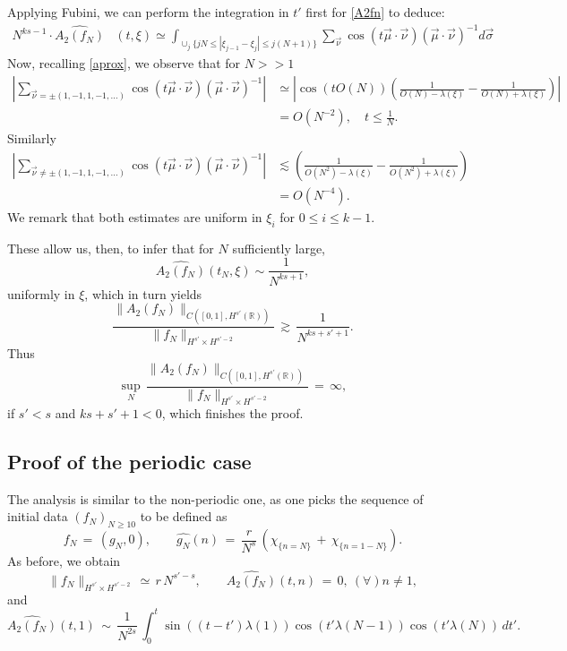 \documentclass{amsart}
\begin{document}
Applying Fubini, we can perform the integration in $t'$ first for \eqref{A2fn} to deduce:
\begin{equation}
  \begin{split}
    N^{ks -1}\cdot \widehat{A_2(f_N)}&(t,\xi)
    \simeq
    \int_{\cup_{j}\{jN \leq |\xi_{j-1}-\xi_{j}|\leq j(N+1)\}}
    \sum_{\vec{\nu}}  \cos(t \vec{\mu} \cdot \vec{\nu}) (\vec{\mu} \cdot \vec{\nu})^{-1}
    d \vec{\sigma} 
  \end{split}
\end{equation}
Now, recalling \eqref{aprox}, we observe that for $N >>1$
\begin{equation*}
\begin{split}
| \sum_{\vec{\nu} = \pm (1, -1, 1, -1, \dots)}  \cos(t \vec{\mu} \cdot \vec{\nu}) (\vec{\mu} \cdot \vec{\nu})^{-1} |
& \simeq 
\left | \cos(t O(N)) 
\left ( \frac{1}{O(N) - \lambda(\xi)} - \frac{1}{O(N)+ \lambda(\xi)} \right ) \right |
\\
& = O(N^{-2}), \quad  t \le \frac{1}{N}.
\end{split}
\end{equation*}
Similarly
\begin{equation*}
\begin{split}
| \sum_{\vec{\nu} \neq \pm (1, -1, 1, -1, \dots)}  \cos(t \vec{\mu} \cdot \vec{\nu}) (\vec{\mu} \cdot \vec{\nu})^{-1} |
& \lesssim
\left ( \frac{1}{O(N^{2}) - \lambda(\xi)} - \frac{1}{O(N^{2})+ \lambda(\xi)} \right )
\\
& = O(N^{-4}).
\end{split}
\end{equation*}
%
%
We remark that both estimates are uniform in $\xi_{i}$ for $0 \le i \le k-1$.

These allow us, then, to infer that for $N$ sufficiently large,
\[
\widehat{A_2(f_N)}(t_N,\xi) \sim \frac{1}{N^{ks+1}},
\]
uniformly in $\xi$, which in turn yields
\[
\frac{\|A_2(f_N)\|_{C([0,1], H^{s'}(\mathbb{R}))}}{\|f_N\|_{H^{s'}\times H^{s'-2}}}\,\gtrsim\, \frac{1}{N^{ks+s'+1}}.\]
Thus
\[
\sup_N\,\frac{\|A_2(f_N)\|_{C([0,1], H^{s'}(\mathbb{R}))}}{\|f_N\|_{H^{s'}\times H^{s'-2}}}\,=\,\infty,\]
if $s'<s$ and $ks+s'+1<0$, which finishes the proof.

\subsection{Proof of the periodic case} The analysis is similar to the non-periodic one, as one picks the sequence of initial data $(f_N)_{N\geq 10}$ to be defined as
\begin{equation}
f_N\,=\,(g_N, 0), \qquad \widehat{g_N}(n)\,=\,\frac{r}{N^s} \,\left(\chi_{\{n=N\}}\,+\,\chi_{\{n=1-N\}}\right).
\label{fnp}
\end{equation}
As before, we obtain
\[
\|f_N\|_{H^{s'}\times H^{s'-2}}\,\simeq\,r\,N^{s'-s}, \qquad \widehat{A_2(f_N)}(t,n)\,=\,0, \ (\forall) n \neq 1,\]
and
\[
\widehat{A_2(f_N)}(t,1)\,\sim\,\frac{1}{N^{2s}}\,\int_0^t \sin((t-t') \lambda(1))\cos(t' \lambda(N-1))\cos(t'\lambda(N))\,dt'.
\]
\end{document}
